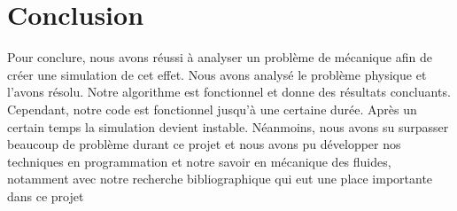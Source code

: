 \section*{Conclusion}
    Pour conclure, nous avons réussi à analyser un problème de mécanique afin de créer une simulation de cet effet. Nous avons analysé le problème physique et l'avons résolu. Notre algorithme est fonctionnel et donne des résultats concluants. Cependant, notre code est fonctionnel jusqu'à une certaine durée. Après un certain temps la simulation devient instable. Néanmoins, nous avons su surpasser beaucoup de problème durant ce projet et nous avons pu développer nos techniques en programmation et notre savoir en mécanique des fluides, notamment avec notre recherche bibliographique qui eut une place importante dans ce projet 
